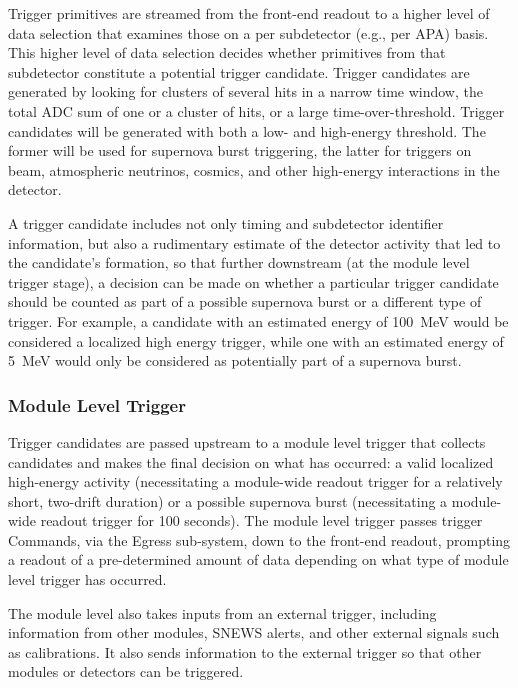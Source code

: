 Trigger primitives are streamed from the front-end  readout to a
higher level of data selection that examines those on a per
subdetector (e.g., per APA) basis. This higher level of data selection decides
whether primitives from that subdetector constitute a potential
trigger candidate. Trigger candidates are generated by looking for
clusters of several hits in a narrow time window, the total ADC sum of one or a
cluster of hits, or a large time-over-threshold. Trigger 
candidates will be generated with both a low- and high-energy threshold. The former
will be used for supernova burst triggering, the latter for triggers on beam, atmospheric
neutrinos, cosmics, and other high-energy interactions in the detector. 

A trigger candidate includes not only timing and subdetector
identifier information, but also a rudimentary estimate of the detector
activity that led to the candidate's formation, so that further downstream (at
the module level trigger stage), a decision can be made on 
whether a particular trigger candidate should be counted as part of a possible supernova
burst or a different type of trigger. For example,
a candidate with an estimated energy of 100~MeV would be considered a
localized high energy trigger, while
one with an estimated energy of 5~MeV would only be considered as potentially part of a
supernova burst.

\subsubsection{Module Level Trigger}
Trigger candidates are passed upstream to a module level trigger that collects candidates
and makes the final decision on what has occurred: a valid localized high-energy
activity (necessitating a module-wide readout trigger for a relatively
short, two-drift duration) or a possible supernova burst (necessitating a module-wide readout
trigger for 100 seconds). The module level trigger passes
trigger Commands, via the Egress sub-system, down to the front-end 
readout, prompting a readout of a pre-determined amount of data depending
on what type of module level trigger has occurred. 

The module level also takes inputs 
from an external trigger, including information from other
modules, SNEWS alerts, and other external signals such as
calibrations. 
It also sends information to the external trigger so that other modules or
detectors can be triggered.

